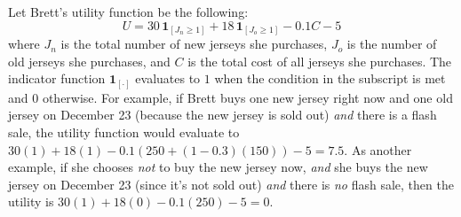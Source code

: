 \documentclass[12pt]{article}
\begin{document}
Let Brett's utility function be the following:
\begin{equation*}
    U = 30\, \mathbf{1}_{[J_n \geq 1]} + 18\, \mathbf{1}_{[J_o \geq 1]} - 0.1C - 5
\end{equation*}
where $J_n$ is the total number of new jerseys she purchases, $J_o$ is the number of old jerseys she purchases, and $C$ is the total cost of all jerseys she purchases. The indicator function $\mathbf{1}_{[\cdot]}$ evaluates to $1$ when the condition in the subscript is met and $0$ otherwise. For example, if Brett buys one new jersey right now and one old jersey on December 23 (because the new jersey is sold out) {\it and} there is a flash sale, the utility function would evaluate to $30(1) + 18(1) - 0.1(250 + (1-0.3)(150)) - 5 = 7.5$. As another example, if she chooses {\it not} to buy the new jersey now, {\it and} she buys the new jersey on December 23 (since it's not sold out) {\it and} there is {\it no} flash sale, then the utility is $30(1) + 18(0) - 0.1(250) - 5 = 0$.
\end{document}
